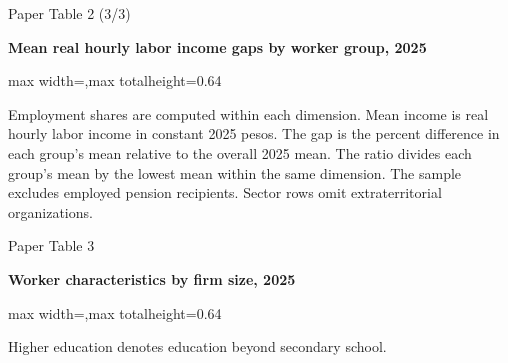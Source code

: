 \begin{frame}{Paper Table 2 (3/3)}
\begin{minipage}{\textwidth}\small\textbf{Mean real hourly labor income gaps by worker group, 2025}\end{minipage}\par\vspace{0.15cm}
\centering\begingroup\fontsize{8.5}{10}\selectfont
\setlength{\tabcolsep}{4pt}\renewcommand{\arraystretch}{1.06}
\begin{adjustbox}{max width=\textwidth,max totalheight=0.64\textheight}

\end{adjustbox}\endgroup\par\vspace{0.10cm}
{\fontsize{6.5}{7.5}\selectfont\raggedright Employment shares are computed within each dimension. Mean income is real hourly labor income in constant 2025 pesos. The gap is the percent difference in each group's mean relative to the overall 2025 mean. The ratio divides each group's mean by the lowest mean within the same dimension. The sample excludes employed pension recipients. Sector rows omit extraterritorial organizations.\par}
\end{frame}

\begin{frame}{Paper Table 3}
\begin{minipage}{\textwidth}\small\textbf{Worker characteristics by firm size, 2025}\end{minipage}\par\vspace{0.15cm}
\centering\begingroup\fontsize{8.5}{10}\selectfont
\setlength{\tabcolsep}{4pt}\renewcommand{\arraystretch}{1.06}
\begin{adjustbox}{max width=\textwidth,max totalheight=0.64\textheight}

\end{adjustbox}\endgroup\par\vspace{0.10cm}
{\fontsize{6.5}{7.5}\selectfont\raggedright Higher education denotes education beyond secondary school.\par}
\end{frame}


